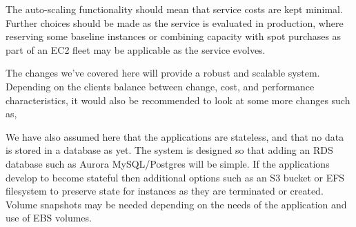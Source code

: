 
The auto-scaling functionality should mean that service costs are kept minimal. Further choices should be made as the service is evaluated in production, where reserving some baseline instances or combining capacity with spot purchases as part of an EC2 fleet may be applicable as the service evolves.


The changes we've covered here will provide a robust and scalable system. Depending on the clients balance between change, cost, and performance characteristics, it would also be recommended to look at some more changes such as,


We have also assumed here that the applications are stateless, and that no data is stored in a database as yet. The system is designed so that adding an RDS database such as Aurora MySQL/Postgres will be simple. If the applications develop to become stateful then additional options such as an S3 bucket or EFS filesystem to preserve state for instances as they are terminated or created. Volume snapshots may be needed depending on the needs of the application and use of EBS volumes. 